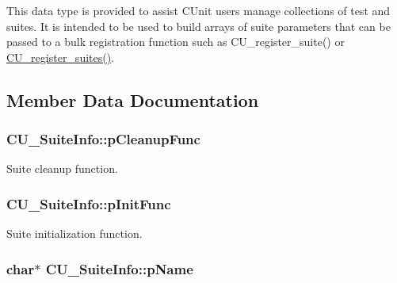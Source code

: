 This data type is provided to assist C\+Unit users manage collections of test and suites. It is intended to be used to build arrays of suite parameters that can be passed to a bulk registration function such as C\+U\+\_\+register\+\_\+suite() or \hyperlink{group___framework_ga331001da0a8bd8faececdb48e7ad3f96}{C\+U\+\_\+register\+\_\+suites()}. 

\subsection{Member Data Documentation}
\hypertarget{struct_c_u___suite_info_a61c244259454b00b3ceb94663ebfbf5a}{
\subsubsection[{p\+Cleanup\+Func}]{ C\+U\+\_\+\+Suite\+Info\+::p\+Cleanup\+Func}}\label{struct_c_u___suite_info_a61c244259454b00b3ceb94663ebfbf5a}


Suite cleanup function. 

\hypertarget{struct_c_u___suite_info_a2716df9d804ab99c9b84b78b7f951aa2}{
\subsubsection[{p\+Init\+Func}]{ C\+U\+\_\+\+Suite\+Info\+::p\+Init\+Func}}\label{struct_c_u___suite_info_a2716df9d804ab99c9b84b78b7f951aa2}


Suite initialization function. 

\hypertarget{struct_c_u___suite_info_adfd97039a37a46383eba735f20dc4831}{
\subsubsection[{p\+Name}]{\setlength{\rightskip}{0pt plus 5cm}char$\ast$ C\+U\+\_\+\+Suite\+Info\+::p\+Name}}\label{struct_c_u___suite_info_adfd97039a37a46383eba735f20dc4831}


